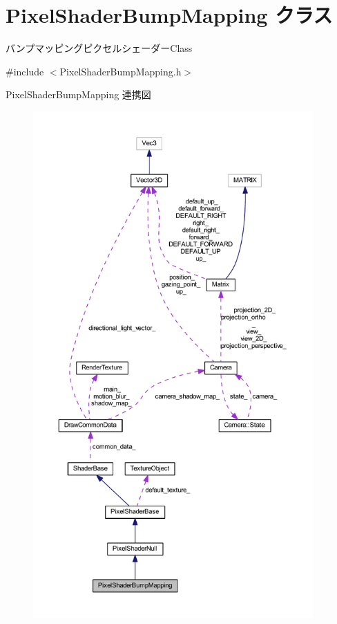 \hypertarget{class_pixel_shader_bump_mapping}{}\section{Pixel\+Shader\+Bump\+Mapping クラス}
\label{class_pixel_shader_bump_mapping}


バンプマッピングピクセルシェーダー\+Class  




{\ttfamily \#include $<$Pixel\+Shader\+Bump\+Mapping.\+h$>$}



Pixel\+Shader\+Bump\+Mapping 連携図\nopagebreak
\begin{figure}[H]
\begin{center}
\leavevmode
\includegraphics[height=550pt]{class_pixel_shader_bump_mapping__coll__graph}
\end{center}
\end{figure}
